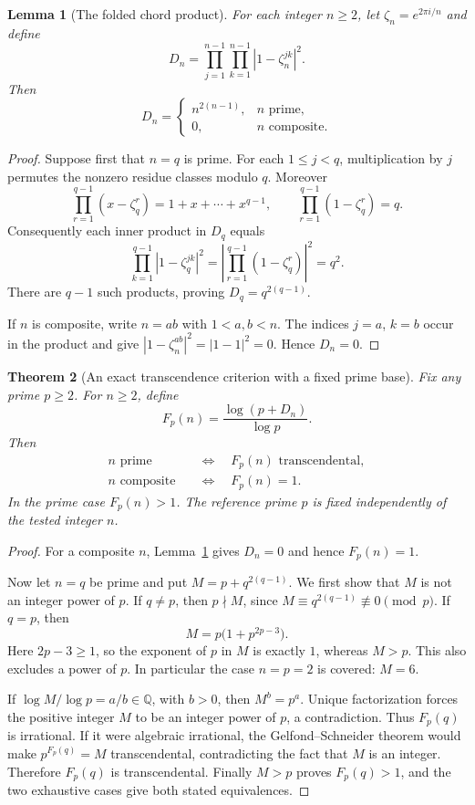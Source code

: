 \documentclass[11pt,a4paper]{article}
\newtheorem{theorem}{Theorem}[section]
\newtheorem{lemma}[theorem]{Lemma}
\theoremstyle{definition}
\theoremstyle{remark}
\numberwithin{equation}{section}
\begin{document}
\begin{lemma}[The folded chord product]
\label{C:lem:folded-chord-product}
For each integer $n\ge2$, let $\zeta_n=e^{2\pi i/n}$ and define
\[
 D_n=\prod_{j=1}^{n-1}\prod_{k=1}^{n-1}
           |1-\zeta_n^{jk}|^2.
\]
Then
\[
 \boxed{D_n=
 \begin{cases}
 n^{2(n-1)},&n\text{ prime},\\
 0,&n\text{ composite}.
 \end{cases}}
\]
\end{lemma}
\begin{proof}
Suppose first that $n=q$ is prime. For each $1\le j<q$, multiplication
by $j$ permutes the nonzero residue classes modulo $q$. Moreover
\[
 \prod_{r=1}^{q-1}(x-\zeta_q^r)=1+x+\cdots+x^{q-1},
 \qquad
 \prod_{r=1}^{q-1}(1-\zeta_q^r)=q.
\]
Consequently each inner product in $D_q$ equals
\[
 \prod_{k=1}^{q-1}|1-\zeta_q^{jk}|^2
 =\left|\prod_{r=1}^{q-1}(1-\zeta_q^r)\right|^2=q^2.
\]
There are $q-1$ such products, proving $D_q=q^{2(q-1)}$.

If $n$ is composite, write $n=ab$ with $1<a,b<n$. The indices
$j=a$, $k=b$ occur in the product and give
$|1-\zeta_n^{ab}|^2=|1-1|^2=0$. Hence $D_n=0$.
\end{proof}

\begin{theorem}[An exact transcendence criterion with a fixed prime base]
\label{C:thm:chord-product-prime}
Fix any prime $p\ge2$. For $n\ge2$, define
\[
 F_p(n)=\frac{\log(p+D_n)}{\log p}.
\]
Then
\[
 \boxed{
 \begin{aligned}
 n\text{ prime}&\quad\Longleftrightarrow\quad
          F_p(n)\text{ transcendental},\\
 n\text{ composite}&\quad\Longleftrightarrow\quad F_p(n)=1.
 \end{aligned}}
\]
In the prime case $F_p(n)>1$. The reference prime $p$ is fixed
independently of the tested integer $n$.
\end{theorem}
\begin{proof}
For a composite $n$, Lemma~\ref{C:lem:folded-chord-product} gives
$D_n=0$ and hence $F_p(n)=1$.

Now let $n=q$ be prime and put $M=p+q^{2(q-1)}$. We first show that
$M$ is not an integer power of $p$. If $q\ne p$, then $p\nmid M$,
since $M\equiv q^{2(q-1)}\not\equiv0\pmod p$. If $q=p$, then
\[
 M=p\bigl(1+p^{2p-3}\bigr).
\]
Here $2p-3\ge1$, so the exponent of $p$ in $M$ is exactly $1$,
whereas $M>p$. This also excludes a power of $p$. In particular
the case $n=p=2$ is covered: $M=6$.

If $\log M/\log p=a/b\in\mathbb Q$, with $b>0$, then
$M^b=p^a$. Unique factorization forces the positive integer $M$ to
be an integer power of $p$, a contradiction. Thus $F_p(q)$ is
irrational. If it were algebraic irrational, the Gelfond--Schneider
theorem would make $p^{F_p(q)}=M$ transcendental, contradicting the
fact that $M$ is an integer. Therefore $F_p(q)$ is transcendental.
Finally $M>p$ proves $F_p(q)>1$, and the two exhaustive cases give
both stated equivalences.
\end{proof}
\end{document}
